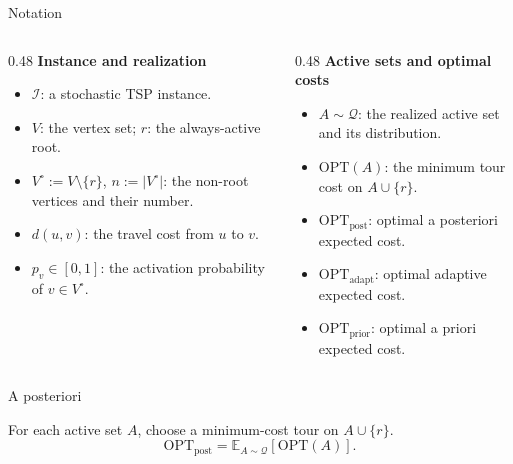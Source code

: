 \documentclass[aspectratio=169,12pt]{beamer}
\newcommand{\OPT}{\mathrm{OPT}}
\newcommand{\optpost}{\OPT_{\mathrm{post}}}
\newcommand{\optadapt}{\OPT_{\mathrm{adapt}}}
\newcommand{\optprior}{\OPT_{\mathrm{prior}}}
\newcommand{\E}{\mathbb{E}}
\begin{document}
\begin{frame}{Notation}
  \begin{columns}[T,onlytextwidth]
    \begin{column}{0.48\textwidth}
      \textbf{Instance and realization}
      \begin{itemize}\setlength{\itemsep}{0.48em}
        \item \(\mathcal I\): a stochastic TSP instance.
        \item \(V\): the vertex set; \(r\): the always-active root.
        \item \(V^\circ:=V\setminus\{r\}\), \(n:=|V^\circ|\): the
          non-root vertices and their number.
        \item \(d(u,v)\): the travel cost from \(u\) to \(v\).
        \item \(p_v\in[0,1]\): the activation probability of
          \(v\in V^\circ\).
      \end{itemize}
    \end{column}
    \begin{column}{0.48\textwidth}
      \textbf{Active sets and optimal costs}
      \begin{itemize}\setlength{\itemsep}{0.48em}
        \item \(A\sim\mathcal Q\): the realized active set and its
          distribution.
        \item \(\OPT(A)\): the minimum tour cost on \(A\cup\{r\}\).
        \item \(\optpost\): optimal a posteriori expected cost.
        \item \(\optadapt\): optimal adaptive expected cost.
        \item \(\optprior\): optimal a priori expected cost.
      \end{itemize}
    \end{column}
  \end{columns}
\end{frame}

\begin{frame}{A posteriori}
  \centering
  {\small\bfseries
    \makebox[0.41\linewidth]{\textcolor{ThTeal}{Best tour for this active set}}\par}
  \smallskip
  \resizebox{0.82\linewidth}{!}{\ThPosterioriExample}

  \medskip
  For each active set \(A\), choose a minimum-cost tour on
  \(A\cup\{r\}\).
  \[
    \optpost=\E_{A\sim\mathcal Q}\!\left[\OPT(A)\right].
  \]
\end{frame}
\end{document}
